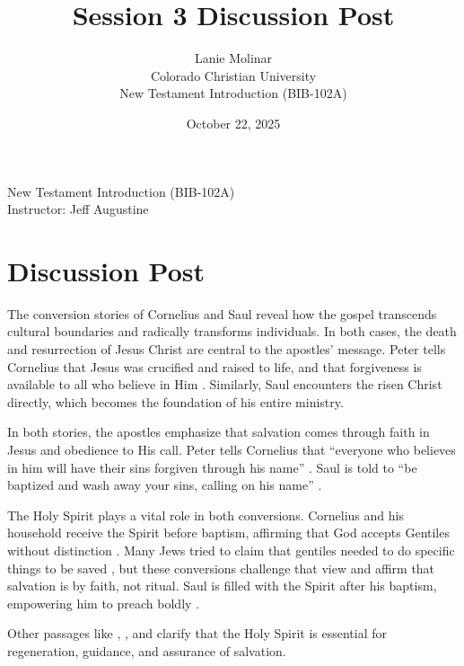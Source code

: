 \documentclass[12pt,letterpaper]{article}
\title{Session 3 Discussion Post}
\author{Lanie Molinar\\Colorado Christian University\\New Testament Introduction (BIB-102A)}
\date{October 22, 2025}
\begin{document}
\begin{titlepage}
\maketitle
\thispagestyle{fancy}

\begin{center}
New Testament Introduction (BIB-102A)\\
Instructor: Jeff Augustine
\end{center}
\end{titlepage}

\section{Discussion Post}

The conversion stories of Cornelius \parencite[Acts 10–11]{Tyndale1996} and Saul \parencite[Acts 9; 22; 26]{Tyndale1996} reveal how the gospel transcends cultural boundaries and radically transforms individuals. In both cases, the death and resurrection of Jesus Christ are central to the apostles’ message. Peter tells Cornelius that Jesus was crucified and raised to life, and that forgiveness is available to all who believe in Him \parencite[Acts 10:39–43]{Tyndale1996}. Similarly, Saul encounters the risen Christ directly, which becomes the foundation of his entire ministry.

In both stories, the apostles emphasize that salvation comes through faith in Jesus and obedience to His call. Peter tells Cornelius that “everyone who believes in him will have their sins forgiven through his name” \parencite[Acts 10:43]{Tyndale1996}. Saul is told to “be baptized and wash away your sins, calling on his name” \parencite[Acts 22:16]{Tyndale1996}.

The Holy Spirit plays a vital role in both conversions. Cornelius and his household receive the Spirit before baptism, affirming that God accepts Gentiles without distinction \parencite[Acts 10:44–48]{Tyndale1996}. Many Jews tried to claim that gentiles needed to do specific things to be saved \parencite[chapter 15]{elwellEncounteringNewTestament2022}, but these conversions challenge that view and affirm that salvation is by faith, not ritual. Saul is filled with the Spirit after his baptism, empowering him to preach boldly \parencite[Acts 9:17–20]{Tyndale1996}.

Other passages like \textcite[John 3:5]{Tyndale1996}, \textcite[Romans 8:9–11]{Tyndale1996}, and \textcite[Titus 3:5–6]{Tyndale1996} clarify that the Holy Spirit is essential for regeneration, guidance, and assurance of salvation.
\end{document}
